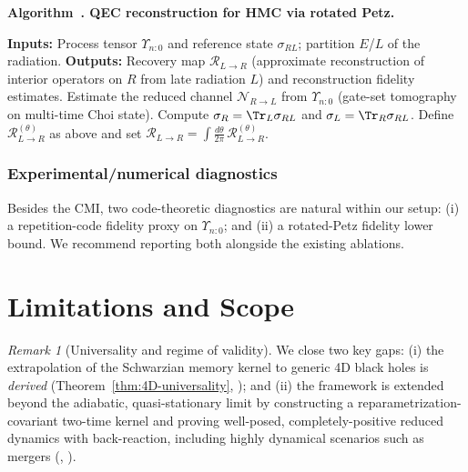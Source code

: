\documentclass[aps,prd,preprint,onecolumn,superscriptaddress,nofootinbib,longbibliography,floatfix,11pt,showpacs,showkeys]{revtex4-2}
\newcommand{\HMC}{\textsc{HMC}\xspace}
\newcounter{algorithm}
\newcommand{\algcaptionname}{Algorithm}
\newcommand{\hmcalgOldCaption}{}
\newenvironment{algorithm}[1][]{%
  \refstepcounter{algorithm}%
  \begin{infobox}%
  \let\hmcalgOldCaption\caption
  \renewcommand{\caption}[1]{\noindent\textbf{\algcaptionname~\thealgorithm. ##1}\\[0.6ex]}%
}{%
  \par\vspace{-0.4\baselineskip}%
  \let\caption\hmcalgOldCaption
  \end{infobox}%
}
\theoremstyle{plain}
\theoremstyle{definition}
\theoremstyle{remark}
\newtheorem{remark}[theorem]{Remark}
\begin{document}
\begin{algorithm}[t!]
\caption{QEC reconstruction for \HMC{} via rotated Petz.}
\label{alg:rotated_petz_hmc}
\begin{algorithmic}[1]
\State \textbf{Inputs:} Process tensor $\Upsilon_{n{:}0}$ and reference state $\sigma_{RL}$; partition $E$/$L$ of the radiation.
\State \textbf{Outputs:} Recovery map $\mathcal{R}_{L\to R}$ (approximate reconstruction of interior operators on $R$ from late radiation $L$) and reconstruction fidelity estimates.
\State Estimate the reduced channel $\mathcal{N}_{R\to L}$ from $\Upsilon_{n{:}0}$ (gate-set tomography on multi-time Choi state).
\State Compute $\sigma_R=\Tr_L\sigma_{RL}$ and $\sigma_L=\Tr_R\sigma_{RL}$.
\State Define $\mathcal{R}^{(\theta)}_{L\to R}$ as above and set $\mathcal{R}_{L\to R} = \int \frac{d\theta}{2\pi}\,\mathcal{R}^{(\theta)}_{L\to R}$.
\end{algorithmic}
\end{algorithm}

\subsubsection{Experimental/numerical diagnostics}
Besides the CMI, two code-theoretic diagnostics are natural within our setup: (i) a repetition-code fidelity proxy on $\Upsilon_{n{:}0}$; and (ii) a rotated-Petz fidelity lower bound. We recommend reporting both alongside the existing ablations.


\section{Limitations and Scope}
\label{sec:limitations}
\begin{remark}[Universality and regime of validity]
\label{rem:limitations}
We close two key gaps: (i) the extrapolation of the Schwarzian memory kernel to generic 4D black holes is \emph{derived} (Theorem~\ref{thm:4D-universality}, ); and (ii) the framework is extended beyond the adiabatic, quasi-stationary limit by constructing a reparametrization-covariant two-time kernel and proving well-posed, completely-positive reduced dynamics with back-reaction, including highly dynamical scenarios such as mergers (, ).
\end{remark}
\end{document}
